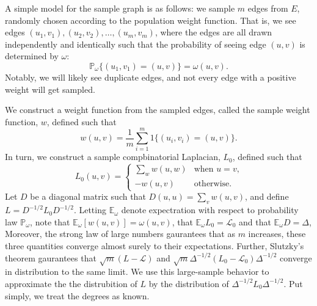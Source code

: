 \documentclass[12pt]{article}
\newcommand{\prob}{\mathbb{P}}
\newcommand{\E}{\mathbb{E}}
\theoremstyle{plain}
\begin{document}
A simple model for the sample graph is as follows: we sample $m$ edges
from $E$, randomly chosen according to the population weight function.
That is, we see edges $(u_1, v_1), (u_2, v_2), \dotsc, (u_m, v_m)$,
where the edges are all drawn independently and identically such that
the probability of seeing edge $(u,v)$ is determined by $\omega$:
\[
  \prob_\omega\{ (u_1, v_1) = (u,v) \} = \omega(u,v).
\]
Notably, we will likely see duplicate edges, and not every edge with a
positive weight will get sampled.

We construct a weight function from the sampled edges, called the
sample weight function, $w$, defined such that
\[
  w(u,v) = \frac{1}{m} \sum_{i=1}^{m} 1\{ (u_i, v_i) = (u,v) \}.
\]
In turn, we construct a sample compbinatorial Laplacian, $L_0$,
defined such that
\[
  L_0(u,v)
    =
    \begin{cases}
      \sum_{w} w(u,w) &\text{when $u = v$,} \\
      -w(u,v) &\text{otherwise.}
    \end{cases}
\]
Let $D$ be a diagonal matrix such that
$D(u,u) = \sum_{v} w(u,v)$, and define $L = D^{-1/2} L_0 D^{-1/2}$.
Letting $\E_\omega$ denote expectration with respect to probability
law $\prob_\omega$, note that $\E_\omega[w(u,v)] = \omega(u,v)$,
that $\E_\omega L_0 = \mathcal{L}_0$ and that $\E_\omega D = \Delta$,
Moreover, the strong law of large numbers gaurantees that as $m$ increases,
these three quantities converge almost surely to their expectations.
Further, Slutzky's theorem gaurantees that $\sqrt{m} (L - \mathcal{L})$ and
$\sqrt{m} \Delta^{-1/2} (L_0 - \mathcal{L}_0) \Delta^{-1/2}$ converge in
distribution to the same limit.  We use this large-sample behavior to
approximate the the distrubition of $L$ by the distribution of
$\Delta^{-1/2} L_0 \Delta^{-1/2}$.  Put simply, we treat the degrees as known.
\end{document}
